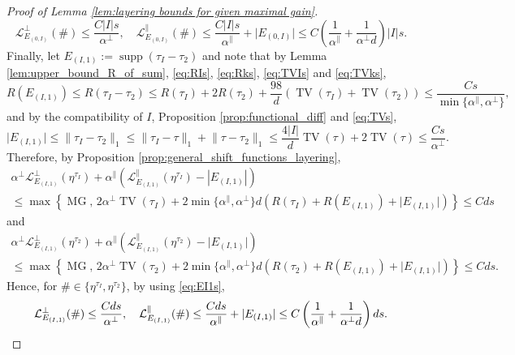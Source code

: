 \documentclass[11pt, reqno]{amsart}
\DeclareMathOperator{\supp}{supp}
\DeclareMathOperator{\TV}{TV}
\DeclareMathOperator{\MG}{MG}
\numberwithin{equation}{section}
\begin{document}
\begin{proof} [Proof of Lemma \ref{lem:layering bounds for given maximal gain}]
\begin{equation*}
\mathcal{L}^{\perp}_{E_{(0,I)}}(\#) \leq  \frac{C\lvert I\rvert s}{\alpha^{\perp}}  ,\quad \mathcal{L}^{\parallel}_{E_{(0,I)}} (\#) \leq \frac{C\lvert I\rvert s}{\alpha^{\parallel}}+\lvert E_{(0,I)}\rvert\leq C\left( \frac{1}{\alpha^{\parallel}}+\frac{1}{\alpha^{\perp}d}  \right) |I|s.      
\end{equation*}
Finally, let $E_{(I,1 )}:=\supp \left(\tau_I-\tau_2\right)$ and note that by Lemma \ref{lem:upper_bound_R_of_sum}, \eqref{eq:RIs}, \eqref{eq:Rks}, \eqref{eq:TVIs} and \eqref{eq:TVks},
$$
R\left(E_{(I,1)}\right)\leq R\left(\tau_I-\tau_2\right)\leq R\left(\tau_I\right)+2R\left(\tau_2\right)+\frac{98}{d}\left(\TV\left(\tau_I\right)+\TV\left(\tau_2\right)\right)\leq \frac{C s}{\min\{\alpha^{\parallel},\alpha^{\perp}\}}, 
$$
and by the compatibility of $I$, Proposition \ref{prop:functional_diff} and \eqref{eq:TVs}, 
\begin{equation}\label{eq:EI1s}
\lvert E_{(I,1)}\rvert\leq\lVert \tau_I-\tau_2\rVert_1\leq \lVert \tau_I-\tau\rVert_1+\lVert \tau-\tau_2\rVert_1\leq \frac{4\lvert I\rvert}{d}\TV(\tau)+2\TV(\tau)\leq \frac{C s}{\alpha^{\perp}}.
\end{equation}
Therefore, by Proposition \ref{prop:general_shift_functions_layering},
\begin{multline*}
\alpha^{\perp}\mathcal{L}^{\perp}_{E_{(I,1)}}(\eta^{\tau_I})+ \alpha^{\parallel} \left( \mathcal{L}^{\parallel}_{E_{(I,1)}}(\eta^{\tau_I}) -|E_{(I,1)}| \right) \\
\leq \max\left\{  \MG,\, 2\alpha^{\perp}\TV\left(\tau_I\right)+2\min \{ \alpha^{\parallel}, \alpha^{\perp} \}d\left(R(\tau_I)+R\left(E_{(I,1)}\right)+\lvert E_{(I,1)}\rvert\right)\right\}\leq C d s
\end{multline*}
and
\begin{multline*}
\alpha^{\perp}\mathcal{L}^{\perp}_{E_{(I,1)}}(\eta^{\tau_2})+ \alpha^{\parallel} \left( \mathcal{L}^{\parallel}_{E_{(I,1)}}(\eta^{\tau_2}) -\lvert E_{(I,1)}\rvert \right) \\
\leq \max\left\{  \MG,\, 2\alpha^{\perp}\TV\left(\tau_2\right)+2\min \{ \alpha^{\parallel}, \alpha^{\perp} \}d\left(R(\tau_2)+R\left(E_{(I,1)}\right)+\lvert E_{(I,1)}\rvert\right)\right\}\leq C d s.
\end{multline*}
Hence, for $\# \in \{\eta^{\tau_I},\eta^{\tau_2}\}$, by using \eqref{eq:EI1s},
\begin{equation*}
\mathcal{L}^{\perp}_{E_{(I,1)}}(\#) \leq  \frac{C ds}{\alpha^{\perp}} ,\quad \mathcal{L}^{\parallel}_{E_{(I,1)}} (\#) \leq \frac{C d s}{\alpha^{\parallel}}+\lvert E_{(I,1)}\rvert\leq C\left( \frac{1}{\alpha^{\parallel}}+\frac{1}{\alpha^{\perp}d}  \right) d s.
\qedhere
\end{equation*}
\end{proof}
\end{document}
